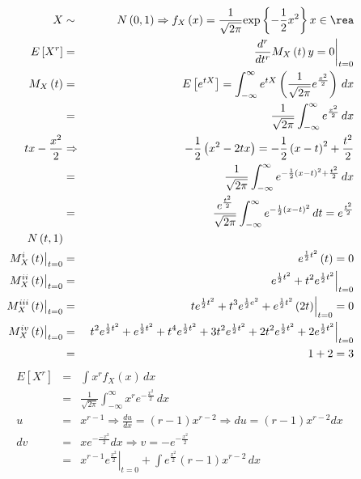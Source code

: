 \begin{enumerate}
\begin{eqnarray*}
X &\sim & N \left(0,1 \right) \Rightarrow f_{X}\left(x \right)= \frac{1}{\sqrt{2\pi}} \textrm{exp} \left\{- \frac{1}{2}x^2 \right\} x\in \rea \\
E \left[ X^{r} \right] &=& \left.\frac{d^{r} } {dt^{r}} M_{X}\left( t \right) {y=0} \right|_{t=0}\\
M_{X} \left(t \right) &=& E \left[e^{tX} \right] = \int_{-\infty }^{\infty} e^{tX}\left(\frac{1}{\sqrt{2\pi}}e^{\frac{x^{2} }{2}} \right) \, dx\\
&=& \frac{1}{\sqrt{2\pi}}\int_{-\infty }^{ \infty } e^{\frac{x^{2} }{2}}\, dx \\
tx- \frac{x^{2}}{2} & \Rightarrow & - \frac{1}{2}\left(x^{2}- 2tx  \right)= - \frac{1}{2} \left(x-t \right)^{2}+ \frac{t^{2}}{2}\\
&=&\frac{1}{\sqrt{2\pi}} \int_{-\infty}^{\infty} e^{- \frac{1}{2}\left(x-t \right)^2+ \frac{t^2}{2} }\,dx\\
&=&\frac{e^{\frac{t^2}{2}}}{\sqrt{2\pi}} \int_{-\infty}^{\infty} e^{- \frac{1}{2}\left(x-t \right)^2 }\,dt = e^{\frac{t^2}{2}}\\
N \left(t,1 \right)\\
\left. M^{i}_{X}\left(t \right)\right|_{t=0} &=& e^{\frac{1}{2}t^2}\left(t \right)=0\\
\left. M^{ii}_{X}\left(t \right)\right|_{t=0} &=&\left. e^{\frac{1}{2}t^2}+ t^2e^{\frac{1}{2}t^2}\right|_{t=0}\\
\left. M^{iii}_{X}\left(t \right)\right|_{t=0} &=& \left. te^{\frac{1}{2}t^2}+ t^3e^{\frac{1}{2}e^2}+ e^{\frac{1}{2}t^2}\left( 2t \right)\right|_{t=0} =0\\
\left. M^{iv}_{X}\left(t \right)\right|_{t=0} &=& \left. t^2e^{\frac{1}{2}t^2} + e^{ \frac{1}{2}t^2} + t^4 e^{\frac{1}{2}t^2 }+3 t^2 e^{\frac{1}{2}t^2 }+ 2t^2e^{\frac{1}{2}t^2}+ 2e^{\frac{1}{2}t^2 } \right|_{t=0}\\
&=& 1+2=3
\end{eqnarray*} 
\begin{eqnarray*}
E \left[X^r \right] &=&  \int x^r f_{X}\left(x \right)\, dx\\
&=& \frac{1}{\sqrt{2\pi}} \int_{-\infty}^{\infty}x^r e^{- \frac{x^2}{2} }\, dx\\
u &=& x^{r-1} \Rightarrow \frac{du}{dx}= \left(r-1 \right)x^{r-2} \Rightarrow du= \left( r-1 \right)x^{r-2} dx\\
dv &=& xe^{-\frac{-x^2}{2}} dx \Rightarrow v= - e^{-\frac{x^2}{2}}\\
&=& \left. x^{r-1} e^{\frac{x^2}{2}}\right|_{t=0} + \int e^{\frac{x^2 }{2}} \left(r-1 \right)x^{r-2}\, dx\\

\end{eqnarray*}
\end{enumerate}
